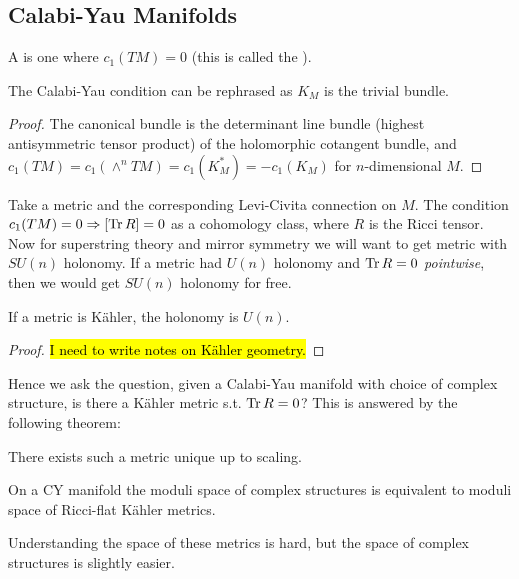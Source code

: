 \documentclass{article}
\begin{document}
\subsection{Calabi-Yau Manifolds}
\begin{definition}
	A  is one where $c_1(TM)=0$ (this is called the ). 
\end{definition}

\begin{prop}
	The Calabi-Yau condition can be rephrased as $K_M$ is the trivial bundle. 
\end{prop}
\begin{proof}
	The canonical bundle is the determinant line bundle (highest antisymmetric tensor product) of the holomorphic cotangent bundle, and $c_1(TM) = c_1(\wedge^n TM) = c_1(K_M^\ast)=-c_1(K_M)$ for $n$-dimensional $M$.
\end{proof}

Take a metric and the corresponding Levi-Civita connection on $M$. The condition $c_1(TM)=0 \Rightarrow [\operatorname{Tr} R]=0$ as a cohomology class, where $R$ is the Ricci tensor. Now for superstring theory and mirror symmetry we will want to get metric with $SU(n)$ holonomy. If a metric had $U(n)$ holonomy and $\operatorname{Tr} R=0$ \emph{pointwise}, then we would get $SU(n)$ holonomy for free. 
\begin{lemma}
	If a metric is K\"ahler, the holonomy is $U(n)$. 
\end{lemma}
\begin{proof}
	\hl{I need to write notes on K\"ahler geometry.}
\end{proof}
Hence we ask the question, given a Calabi-Yau manifold with choice of complex structure, is there a K\"ahler metric s.t. $\operatorname{Tr} R=0$? This is answered by the following theorem:
\begin{theorem}
	There exists such a metric unique up to scaling. 
\end{theorem}
\begin{corollary}
	On a CY manifold the moduli space of complex structures is equivalent to moduli space of Ricci-flat K\"ahler metrics. 
\end{corollary}
\begin{idea}
	Understanding the space of these metrics is hard, but the space of complex structures is slightly easier. 
\end{idea}
\end{document}
